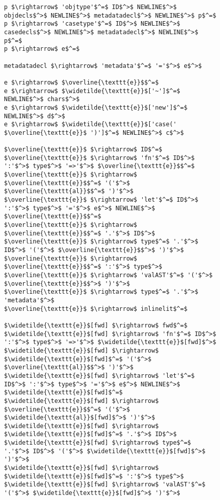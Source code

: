 
\begin{figure}
\begin{lstlisting}[mathescape]
p $\rightarrow$ 'objtype'$^=$ ID$^>$ NEWLINE$^>$ objdecls$^>$ NEWLINE$^>$ metadatadecl$^>$ NEWLINE$^>$ p$^=$
p $\rightarrow$ 'casetype'$^=$ ID$^>$ NEWLINE$^>$ casedecls$^>$ NEWLINE$^>$ metadatadecl$^>$ NEWLINE$^>$ p$^=$
p $\rightarrow$ e$^=$

metadatadecl $\rightarrow$ 'metadata'$^=$ '='$^>$ e$^>$

e $\rightarrow$ $\overline{\texttt{e}}$$^=$
e $\rightarrow$ $\widetilde{\texttt{e}}$['~']$^=$ NEWLINE$^>$ chars$^>$
e $\rightarrow$ $\widetilde{\texttt{e}}$['new']$^=$ NEWLINE$^>$ d$^>$
e $\rightarrow$ $\widetilde{\texttt{e}}$['case(' $\overline{\texttt{e}}$ ')']$^=$ NEWLINE$^>$ c$^>$

$\overline{\texttt{e}}$ $\rightarrow$ ID$^=$
$\overline{\texttt{e}}$ $\rightarrow$ 'fn'$^=$ ID$^>$ ':'$^>$ type$^>$ '=>'$^>$ $\overline{\texttt{e}}$$^=$
$\overline{\texttt{e}}$ $\rightarrow$ $\overline{\texttt{e}}$$^=$ '('$^>$ $\overline{\texttt{al}}$$^=$ ')'$^>$
$\overline{\texttt{e}}$ $\rightarrow$ 'let'$^=$ ID$^>$ ':'$^>$ type$^>$ '='$^>$ e$^>$ NEWLINE$^>$ $\overline{\texttt{e}}$$^=$
$\overline{\texttt{e}}$ $\rightarrow$ $\overline{\texttt{e}}$$^=$ '.'$^>$ ID$^>$
$\overline{\texttt{e}}$ $\rightarrow$ type$^=$ '.'$^>$ ID$^>$ '('$^>$ $\overline{\texttt{e}}$$^>$ ')'$^>$
$\overline{\texttt{e}}$ $\rightarrow$ $\overline{\texttt{e}}$$^=$ ':'$^>$ type$^>$
$\overline{\texttt{e}}$ $\rightarrow$ 'valAST'$^=$ '('$^>$ $\overline{\texttt{e}}$$^>$ ')'$^>$
$\overline{\texttt{e}}$ $\rightarrow$ type$^=$ '.'$^>$ 'metadata'$^>$
$\overline{\texttt{e}}$ $\rightarrow$ inlinelit$^=$

$\widetilde{\texttt{e}}$[fwd] $\rightarrow$ fwd$^=$
$\widetilde{\texttt{e}}$[fwd] $\rightarrow$ 'fn'$^=$ ID$^>$ ':'$^>$ type$^>$ '=>'$^>$ $\widetilde{\texttt{e}}$[fwd]$^>$
$\widetilde{\texttt{e}}$[fwd] $\rightarrow$ $\widetilde{\texttt{e}}$[fwd]$^=$ '('$^>$ $\overline{\texttt{al}}$$^>$ ')'$^>$
$\widetilde{\texttt{e}}$[fwd] $\rightarrow$ 'let'$^=$ ID$^>$ ':'$^>$ type$^>$ '='$^>$ e$^>$ NEWLINE$^>$ $\widetilde{\texttt{e}}$[fwd]$^=$
$\widetilde{\texttt{e}}$[fwd] $\rightarrow$ $\overline{\texttt{e}}$$^=$ '('$^>$ $\widetilde{\texttt{al}}$[fwd]$^>$ ')'$^>$
$\widetilde{\texttt{e}}$[fwd] $\rightarrow$ $\widetilde{\texttt{e}}$[fwd]$^=$ '.'$^>$ ID$^>$
$\widetilde{\texttt{e}}$[fwd] $\rightarrow$ type$^=$ '.'$^>$ ID$^>$ '('$^>$ $\widetilde{\texttt{e}}$[fwd]$^>$ ')'$^>$
$\widetilde{\texttt{e}}$[fwd] $\rightarrow$ $\widetilde{\texttt{e}}$[fwd]$^=$ ':'$^>$ type$^>$
$\widetilde{\texttt{e}}$[fwd] $\rightarrow$ 'valAST'$^=$ '('$^>$ $\widetilde{\texttt{e}}$[fwd]$^>$ ')'$^>$


\end{lstlisting}
\end{figure}
